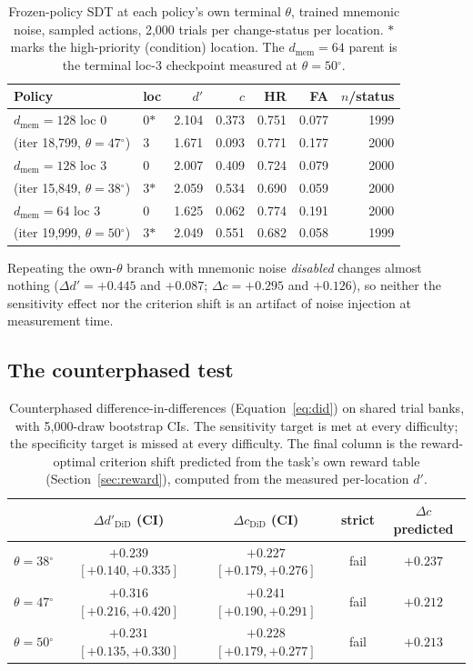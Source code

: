 \documentclass[11pt]{article}
\newcommand{\dprime}{d'}
\newcommand{\dd}{\Delta d'}
\newcommand{\dc}{\Delta c}
\newcommand{\dg}{\ensuremath{^\circ}}
\begin{document}
\begin{table}[h]
\centering\small
\caption{Frozen-policy SDT at each policy's own terminal $\theta$, trained mnemonic noise,
sampled actions, 2{,}000 trials per change-status per location. $\ast$ marks the
high-priority (condition) location. The $d_{\mathrm{mem}}{=}64$ parent is the terminal
loc-3 checkpoint measured at $\theta = 50\dg$.}
\label{tab:sdt}
\begin{tabular}{llrrrrr}
\toprule
\textbf{Policy} & \textbf{loc} & $\dprime$ & $c$ & HR & FA & $n$/status \\
\midrule
$d_{\mathrm{mem}}{=}128$ loc 0 & 0$\ast$ & 2.104 & 0.373 & 0.751 & 0.077 & 1999 \\
(iter 18{,}799, $\theta{=}47\dg$)   & 3       & 1.671 & 0.093 & 0.771 & 0.177 & 2000 \\[2pt]
$d_{\mathrm{mem}}{=}128$ loc 3 & 0       & 2.007 & 0.409 & 0.724 & 0.079 & 2000 \\
(iter 15{,}849, $\theta{=}38\dg$)   & 3$\ast$ & 2.059 & 0.534 & 0.690 & 0.059 & 2000 \\[2pt]
$d_{\mathrm{mem}}{=}64$ loc 3  & 0       & 1.625 & 0.062 & 0.774 & 0.191 & 2000 \\
(iter 19{,}999, $\theta{=}50\dg$)   & 3$\ast$ & 2.049 & 0.551 & 0.682 & 0.058 & 1999 \\
\bottomrule
\end{tabular}
\end{table}

Repeating the own-$\theta$ branch with mnemonic noise \emph{disabled} changes almost
nothing ($\dd = +0.445$ and $+0.087$; $\dc = +0.295$ and $+0.126$), so neither the
sensitivity effect nor the criterion shift is an artifact of noise injection at
measurement time.

\subsection{The counterphased test}

\begin{table}[h]
\centering\small
\caption{Counterphased difference-in-differences (Equation~\ref{eq:did}) on shared trial
banks, with 5{,}000-draw bootstrap CIs. The sensitivity target is met at every difficulty;
the specificity target is missed at every difficulty. The final column is the
reward-optimal criterion shift predicted from the task's own reward table
(Section~\ref{sec:reward}), computed from the measured per-location $\dprime$.}
\label{tab:did}
\begin{tabular}{lccc c}
\toprule
 & $\dd_{\mathrm{DiD}}$ (CI) & $\dc_{\mathrm{DiD}}$ (CI) & strict & $\dc$ predicted \\
\midrule
$\theta = 38\dg$ & $+0.239$ $[+0.140,+0.335]$ & $+0.227$ $[+0.179,+0.276]$ & \textcolor{bad}{fail} & $+0.237$ \\
$\theta = 47\dg$ & $+0.316$ $[+0.216,+0.420]$ & $+0.241$ $[+0.190,+0.291]$ & \textcolor{bad}{fail} & $+0.212$ \\
$\theta = 50\dg$ & $+0.231$ $[+0.135,+0.330]$ & $+0.228$ $[+0.179,+0.277]$ & \textcolor{bad}{fail} & $+0.213$ \\
\bottomrule
\end{tabular}
\end{table}
\end{document}
